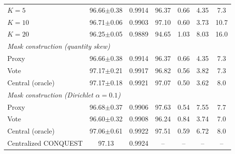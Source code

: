 \begin{table}[!t]
\begin{tabular}{lcccccc}
$K{=}5$ & 96.66$\pm$0.38 & 0.9914 & 96.37 & 0.66 & 4.35 & 7.3 \\
$K{=}10$ & 96.71$\pm$0.06 & 0.9903 & 97.10 & 0.60 & 3.73 & 10.7 \\
$K{=}20$ & 96.25$\pm$0.05 & 0.9889 & 94.65 & 1.03 & 8.03 & 16.0 \\
\midrule
\multicolumn{7}{l}{\textit{Mask construction (quantity skew)}} \\
Proxy & 96.66$\pm$0.38 & 0.9914 & 96.37 & 0.66 & 4.35 & 7.3 \\
Vote & 97.17$\pm$0.21 & 0.9917 & 96.82 & 0.56 & 3.82 & 7.3 \\
Central (oracle) & 97.17$\pm$0.18 & 0.9921 & 97.07 & 0.50 & 3.62 & 8.0 \\
\midrule
\multicolumn{7}{l}{\textit{Mask construction (Dirichlet $\alpha{=}0.1$)}} \\
Proxy & 96.68$\pm$0.37 & 0.9906 & 97.63 & 0.54 & 7.55 & 7.7 \\
Vote & 96.60$\pm$0.32 & 0.9908 & 96.24 & 0.84 & 3.74 & 7.0 \\
Central (oracle) & 97.06$\pm$0.61 & 0.9922 & 97.51 & 0.59 & 6.72 & 8.0 \\
\midrule
Centralized CONQUEST & 97.13 & 0.9924 & -- & -- & -- & -- \\
\hline\toprule
\end{tabular}
\end{table}
